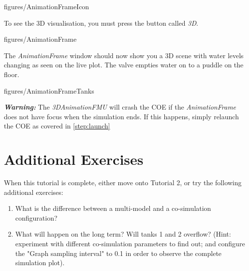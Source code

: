 \documentclass[11pt,a4paper]{../tutorial}
\begin{document}
\begin{instructions}
    \begin{annotation}[scale=0.6]{figures/AnimationFrameIcon}
    \end{annotation}

    To see the 3D visualisation, you must press the button called \emph{3D}.

    \begin{annotation}[width=0.5\linewidth]{figures/AnimationFrame}
    \end{annotation}

\newpage
\item The \emph{AnimationFrame} window should now show you a 3D scene with water levels changing as seen on the live plot. The valve empties water on to a puddle on the floor.

    \begin{annotation}[width=0.5\linewidth]{figures/AnimationFrameTanks}
    \end{annotation}

    \textbf{\emph{Warning:}} The \emph{3DAnimationFMU} will crash the COE if the \emph{AnimationFrame} does not have focus when the simulation ends. If this happens, simply relaunch the COE as covered in \ref{step:launch}


\end{instructions}

\section{Additional Exercises}

When this tutorial is complete, either move onto Tutorial 2, or try the following additional exercises:

\begin{enumerate}
  \item What is the difference between a multi-model and a co-simulation configuration?
  
	\item What will happen on the long term? Will tanks 1 and 2 overflow? (Hint: experiment with different co-simulation parameters to find out; and configure the "Graph sampling interval" to 0.1 in order to observe the complete simulation plot).
\end{enumerate}
\end{document}

